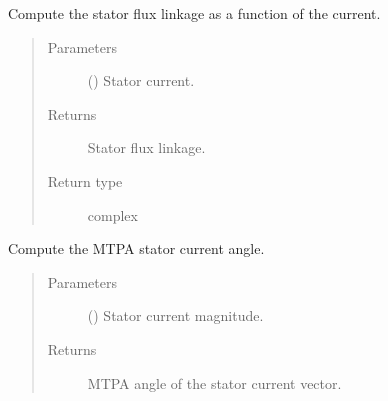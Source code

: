\documentclass[letterpaper,10pt,english]{sphinxmanual}
\begin{document}
\begin{fulllineitems}
\begin{fulllineitems}
\end{fulllineitems}


\begin{fulllineitems}
\label{\detokenize{control.sm:control.sm.torque.TorqueCharacteristics.flux}}
\pysigstartsignatures
{}
\pysigstopsignatures
\sphinxAtStartPar
Compute the stator flux linkage as a function of the current.
\begin{quote}\begin{description}
\item[{Parameters}] \leavevmode
\sphinxAtStartPar
{} () \textendash{} Stator current.

\item[{Returns}] \leavevmode
\sphinxAtStartPar
{} \textendash{} Stator flux linkage.

\item[{Return type}] \leavevmode
\sphinxAtStartPar
complex

\end{description}\end{quote}

\end{fulllineitems}


\begin{fulllineitems}
\label{\detokenize{control.sm:control.sm.torque.TorqueCharacteristics.mtpa}}
\pysigstartsignatures
{}
\pysigstopsignatures
\sphinxAtStartPar
Compute the MTPA stator current angle.
\begin{quote}\begin{description}
\item[{Parameters}] \leavevmode
\sphinxAtStartPar
{} () \textendash{} Stator current magnitude.

\item[{Returns}] \leavevmode
\sphinxAtStartPar
{} \textendash{} MTPA angle of the stator current vector.


\end{description}
\end{quote}
\end{fulllineitems}
\end{fulllineitems}
\end{document}
